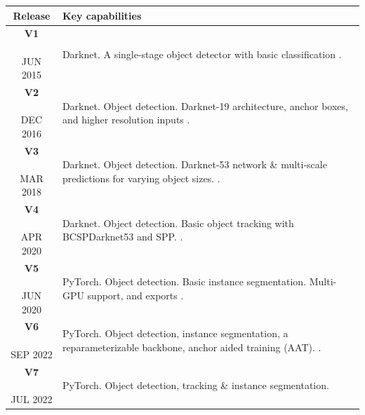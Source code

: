 \documentclass[a4paper,10pt,twocolumn]{article}
\numberwithin{figure}{section}
\numberwithin{table}{section}
\begin{document}
\begin{table}[htbp]
    \centering
    {\small
    \begin{tabularx}{\linewidth}{|c|X|}
        \hline
        \textbf{Release} & \textbf{Key capabilities} \\
        \hline
        \makecell[t]{\textbf{V1} \\ \\ {\tiny JUN 2015}} 
        & {\footnotesize Darknet. A single-stage object detector with basic classification
        \citep{redmon2016you}.} \\
        \hline
        \makecell[t]{\textbf{V2} \\ \\ {\tiny DEC 2016}} 
        & {\footnotesize Darknet. Object detection. Darknet-19 architecture, anchor boxes, and higher resolution inputs
        \citep{redmon2016yolo9000betterfasterstronger}.} \\
        \hline
        \makecell[t]{\textbf{V3} \\ \\ {\tiny MAR 2018}} 
        & {\footnotesize Darknet. Object detection. Darknet-53 network \& multi-scale predictions for varying object sizes.
        \citep{redmon2018yolov3}.} \\
        \hline
        \makecell[t]{\textbf{V4} \\ \\ {\tiny APR 2020}} 
        & {\footnotesize Darknet. Object detection. Basic object tracking with BCSPDarknet53 and SPP.
        \citep{bochkovskiy2020yolov4}.} \\
        \hline
        \makecell[t]{\textbf{V5} \\ \\ {\tiny JUN 2020}} 
        & {\footnotesize PyTorch. Object detection. Basic instance segmentation. Multi-GPU support, and exports 
        \citep{ultralytics2024yolov5}.} \\
        \hline
        \makecell[t]{\textbf{V6} \\ \\ {\tiny SEP 2022}} 
        & {\footnotesize PyTorch. Object detection, instance segmentation, a reparameterizable backbone, anchor aided training (AAT).
        \citep{li2022yolov6}.} \\
        \hline
        \makecell[t]{\textbf{V7} \\ \\ {\tiny JUL 2022}} 
        & {\footnotesize PyTorch. Object detection, tracking \& instance segmentation.
}
\end{tabularx}}
\end{table}
\end{document}
